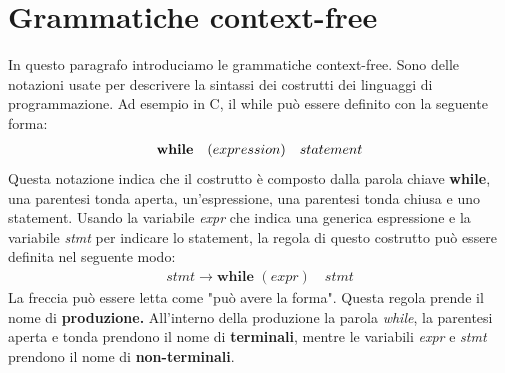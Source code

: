 \section{Grammatiche context-free}
In questo paragrafo introduciamo le grammatiche context-free. Sono delle notazioni usate per descrivere la sintassi dei costrutti dei linguaggi di programmazione. Ad esempio in C, il while può essere definito con la seguente forma:
\begin{align}
	\textbf{while} \quad (expression) \quad statement \notag
\end{align}
Questa notazione indica che il costrutto è composto dalla parola chiave \textbf{while}, una parentesi tonda aperta, un'espressione, una parentesi tonda chiusa e uno statement. Usando la variabile \textit{expr} che indica una generica espressione e la variabile \textit{stmt} per indicare lo statement, la regola di questo costrutto può essere definita nel seguente modo:
\begin{align}\label{regolaWhile}
	stmt \to \textbf{while } ( expr ) \quad stmt 
\end{align}
La freccia può essere letta come "può avere la forma". Questa regola prende il nome di \textbf{produzione. }All'interno della produzione la parola \textit{while}, la parentesi aperta e tonda prendono il nome di \textbf{terminali}, mentre le variabili \textit{expr} e \textit{stmt} prendono il nome di \textbf{non-terminali}.
